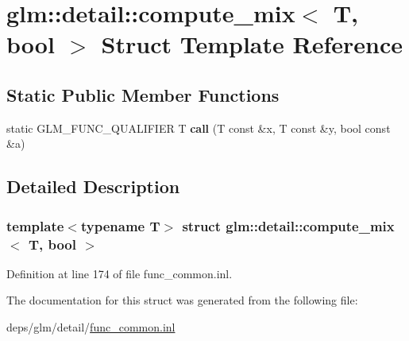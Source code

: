 \hypertarget{structglm_1_1detail_1_1compute__mix_3_01T_00_01bool_01_4}{}\section{glm\+:\+:detail\+:\+:compute\+\_\+mix$<$ T, bool $>$ Struct Template Reference}
\label{structglm_1_1detail_1_1compute__mix_3_01T_00_01bool_01_4}
\subsection*{Static Public Member Functions}
\begin{DoxyCompactItemize}
\item 
\mbox{\label{structglm_1_1detail_1_1compute__mix_3_01T_00_01bool_01_4_a7a83cf7bd102239b974faf18137d8c63}} 
static G\+L\+M\+\_\+\+F\+U\+N\+C\+\_\+\+Q\+U\+A\+L\+I\+F\+I\+ER T {\bfseries call} (T const \&x, T const \&y, bool const \&a)
\end{DoxyCompactItemize}


\subsection{Detailed Description}
\subsubsection*{template$<$typename T$>$\newline
struct glm\+::detail\+::compute\+\_\+mix$<$ T, bool $>$}



Definition at line 174 of file func\+\_\+common.\+inl.



The documentation for this struct was generated from the following file\+:\begin{DoxyCompactItemize}
\item 
deps/glm/detail/\hyperlink{func__common_8inl}{func\+\_\+common.\+inl}\end{DoxyCompactItemize}
